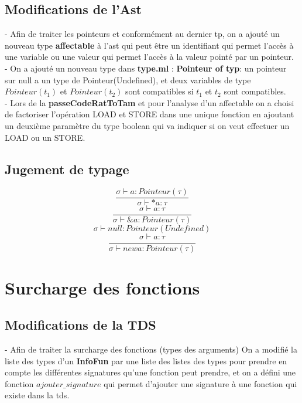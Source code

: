 \documentclass{article}
\begin{document}
\subsection{Modifications de l'Ast}
- Afin de traiter les pointeurs et conformément au dernier tp, on a ajouté un nouveau type \textbf{affectable} à l'ast qui peut être un identifiant qui permet 
l'accès à une variable ou une valeur qui permet l'accès à la valeur pointé par un pointeur. \\
- On a ajouté un nouveau type dans \textbf{type.ml} : \textbf{Pointeur of typ}: un pointeur sur null a un type de Pointeur(Undefined), et deux variables de type 
$Pointeur (t_1)$ et $Pointeur (t_2)$ sont compatibles si $t_1$ et $t_2$ sont compatibles. \\
- Lors de la \textbf{passeCodeRatToTam} et pour l'analyse d'un affectable on a choisi de factoriser l'opération LOAD et STORE dans une unique fonction en 
ajoutant un deuxième paramètre du type boolean qui va indiquer si on veut effectuer un LOAD ou un STORE. \\ 
\subsection{Jugement de typage}
\begin{equation}
    \frac{\sigma \vdash a : Pointeur(\tau)}{\sigma \vdash * a : \tau}
\end{equation}
\begin{equation}
    \frac{\sigma \vdash a :\tau}{\sigma \vdash \& a : Pointeur(\tau)}
\end{equation}
\begin{equation}
    \sigma \vdash null : Pointeur(Undefined)
\end{equation}
\begin{equation}
    \frac{\sigma \vdash a :\tau}{\sigma \vdash new a : Pointeur(\tau)}
\end{equation}
\section{Surcharge des fonctions}
\subsection{Modifications de la TDS}
- Afin de traiter la surcharge des fonctions (types des arguments) On a modifié la liste des types d'un \textbf{InfoFun} par une liste des listes des types 
pour prendre en compte les différentes signatures qu'une fonction peut prendre, et on a défini une fonction $ajouter\_signature$ qui permet d'ajouter une signature 
à une fonction qui existe dans la tds.
\end{document}
